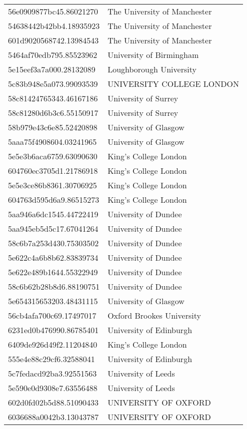\begin{tabular}{ll}
56e0909877bc45.86021270 & The University of Manchester \\
54638442b42bb4.18935923 & The University of Manchester \\
601d9020568742.13984543 & The University of Manchester \\
5464af70edb795.85523962 & University of Birmingham \\
5e15eef3a7a000.28132089 & Loughborough University \\
5c83b948e5a073.99093539 & UNIVERSITY COLLEGE LONDON \\
58c81424765343.46167186 & University of Surrey \\
58c81280d6b3c6.55150917 & University of Surrey \\
58b979e43c6e85.52420898 & University of Glasgow \\
5aaa75f4908604.03241965 & University of Glasgow \\
5e5e3b6aca6759.63090630 & King's College London \\
604760ec3705d1.21786918 & King's College London \\
5e5e3ce86b8361.30706925 & King's College London \\
604763d595d6a9.86515273 & King's College London \\
5aa946a6dc1545.44722419 & University of Dundee \\
5aa945eb5d5c17.67041264 & University of Dundee \\
58c6b7a253d430.75303502 & University of Dundee \\
5e622c4a6b8b62.83839734 & University of Dundee \\
5e622e489b1644.55322949 & University of Dundee \\
58c6b62b28b8d6.88190751 & University of Dundee \\
5e654315653203.48431115 & University of Glasgow \\
56cb4afa700c69.17497017 & Oxford Brookes University \\
6231ed0b476990.86785401 & University of Edinburgh \\
6409de926d49f2.11204840 & King's College London \\
555e4e88c29cf6.32588041 & University of Edinburgh \\
5c7fedacd92ba3.92551563 & University of Leeds \\
5e590e0d9308e7.63556488 & University of Leeds \\
602d0fd02b5d88.51090433 & UNIVERSITY OF OXFORD \\
6036688a0042b3.13043787 & UNIVERSITY OF OXFORD \\

\end{tabular}
